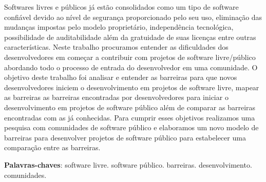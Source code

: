 \begin{resumo}
 
Softwares livres e públicos já estão consolidados como um tipo de software confiável 
devido ao nível de segurança proporcionado pelo seu uso, eliminação das mudanças
impostas pelo modelo proprietário, independência tecnológica, possibilidade de
auditabilidade além da gratuidade de suas licenças entre outras características.
%
Neste trabalho procuramos entender as dificuldades dos desenvolvedores em começar a 
contribuir com projetos de software livre/público abordando todo o processo de 
entrada do desenvolvedor em uma comunidade.
%
O objetivo deste trabalho foi analisar e entender as barreiras para que novos desenvolvedores
iniciem o desenvolvimento em projetos de software livre, mapear as barreiras as barreiras
encontradas por desenvolvedores para iniciar o desenvolvimento em projetos de software
público além de comparar as barreiras encontradas com as já conhecidas. 
%
Para cumprir esses objetivos realizamos uma pesquisa com comunidades de software
público e elaboramos um novo modelo de barreiras para desenvolver projetos de 
software público para estabelecer uma comparação entre as barreiras.
 \vspace{\onelineskip}
    
 \noindent
 \textbf{Palavras-chaves}: software livre. software público. barreiras. desenvolvimento. comunidades.
\end{resumo}
